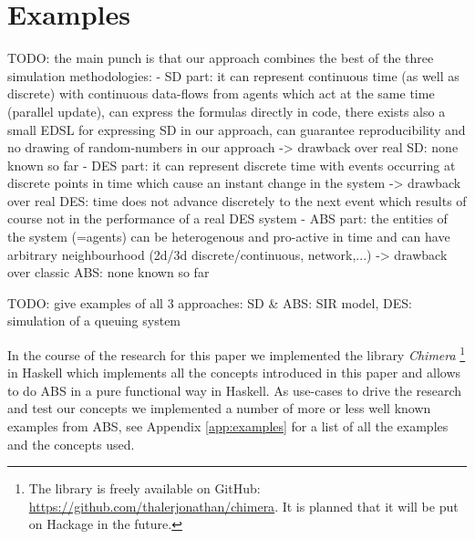 \section{Examples}
TODO: the main punch is that our approach combines the best of the three simulation methodologies:
	- SD part: 	it can represent continuous time (as well as discrete) with continuous data-flows from agents which act at the same time (parallel update), can express the formulas directly in code, there exists also a small EDSL for expressing SD in our approach, can guarantee reproducibility and no drawing of random-numbers in our approach
		-> drawback over real SD: none known so far 
	- DES part: it can represent discrete time with events occurring at discrete points in time which cause an instant change in the system
		-> drawback over real DES: time does not advance discretely to the next event which results of course not in the performance of a real DES system
	- ABS part:	the entities of the system (=agents) can be heterogenous and pro-active in time and can have arbitrary neighbourhood (2d/3d discrete/continuous, network,...)
		-> drawback over classic ABS: none known so far 

TODO: give examples of all 3 approaches: SD \& ABS: SIR model, DES: simulation of a queuing system

In the course of the research for this paper we implemented the library \textit{Chimera} \footnote{The library is freely available on GitHub: \url{https://github.com/thalerjonathan/chimera}. It is planned that it will be put on Hackage in the future.} in Haskell which implements all the concepts introduced in this paper and allows to do ABS in a pure functional way in Haskell. As use-cases to drive the research and test our concepts we implemented a number of more or less well known examples from ABS, see Appendix \ref{app:examples} for a list of all the examples and the concepts used.





